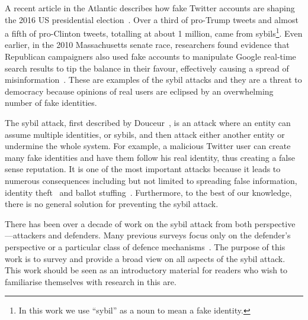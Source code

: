 
\begin{comment}
Electronic commerce and online social networks allow us to orchestrate many
aspects of our lives in the comfort of our homes, behind the monitors of our
devices. With such services, online identity is often required. For example in
Twitter\footnote{Twitter (\texttt{https://twitter.com/}) is a social network website
  where users can send and read short messages---called ``tweets'', users can
  also ``follow'' each other.}, users must create accounts to tweet a friend,
who must also have an account. In this scenario, users can choose to remain
pseudonymous if they are careful, where their real-life identity is uncorrelated
with their online identity. While that is useful for protecting the users'
privacy, it also opens an alleyway for attackers.
\end{comment}

A recent article in the Atlantic describes how fake Twitter accounts are shaping
the 2016 US presidential election~\cite{atlantictwitterbots}. Over a third of
pro-Trump tweets and almost a fifth of pro-Clinton tweets, totalling at about 1
million, came from sybils\footnote{In this work we use ``sybil'' as a noun to
  mean a fake identity.}. Even earlier, in the 2010 Massachusetts senate race,
researchers found evidence that Republican campaigners also used fake accounts
to manipulate Google real-time search results to tip the balance in their
favour, effectively causing a spread of
misinformation~\cite{mustafaraj2010obscurity}. These are examples of the sybil
attacks and they are a threat to democracy because opinions of real users are
eclipsed by an overwhelming number of fake identities.

The sybil attack, first described by Douceur~\cite{douceur2002sybil}, is an
attack where an entity can assume multiple identities, or sybils, and then
attack either another entity or undermine the whole system. For example, a
malicious Twitter user can create many fake identities and have them follow his
real identity, thus creating a false sense reputation. It is one of the most
important attacks because it leads to numerous consequences including but not
limited to spreading false information, identity theft~\cite{bilge2009all} and
ballot stuffing~\cite{bhattacharjee2005avoiding}. Furthermore, to the best of
our knowledge, there is no general solution for preventing the sybil attack.

There has been over a decade of work on the sybil attack from both
perspective---attackers and defenders. Many previous surveys focus only on the
defender's perspective or a particular class of defence
mechanisms~\cite{marti2006taxonomy, mohaisen2013sybil, rakesh2014survey,
  koll2014state}. The purpose of this work is to survey and provide a broad view
on all aspects of the sybil attack. This work should be seen as an introductory
material for readers who wish to familiarise themselves with research in this
are.

